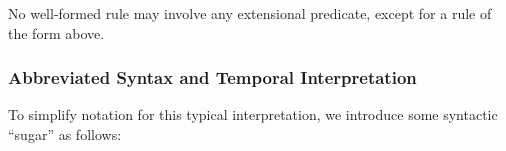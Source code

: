 \vspace{1.2em}
No well-formed \lang rule may involve any extensional predicate, except for a rule of the form above.

\subsubsection{Abbreviated Syntax and Temporal Interpretation}

\label{sec:abbrvsyntax}



To simplify \lang notation for this typical interpretation, we
introduce some syntactic ``sugar'' as follows:

